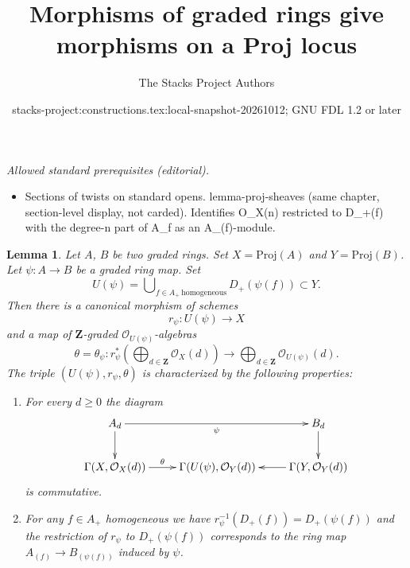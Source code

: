 \documentclass{stacks-project}
\title{Morphisms of graded rings give morphisms on a Proj locus}
\author{The Stacks Project Authors}
\date{stacks-project:constructions.tex:local-snapshot-20261012; GNU FDL 1.2 or later}
\theoremstyle{plain}
\newtheorem{lemma}[subsection]{Lemma}
\theoremstyle{definition}
\theoremstyle{remark}
\numberwithin{equation}{subsection}
\begin{document}
\maketitle
\noindent\textit{Allowed standard prerequisites (editorial).}\begin{itemize}
\item Sections of twists on standard opens. lemma-proj-sheaves (same chapter, section-level display, not carded). Identifies O\_X(n) restricted to D\_+(f) with the degree-n part of A\_f as an A\_(f)-module.
\end{itemize}\medskip
\begin{lemma}
\label{lemma-morphism-proj}
Let $A$, $B$ be two graded rings.
Set $X = \text{Proj}(A)$ and $Y = \text{Proj}(B)$.
Let $\psi : A \to B$ be a graded ring map.
Set
$$
U(\psi)
=
\bigcup\nolimits_{f \in A_{+}\ \text{homogeneous}} D_{+}(\psi(f))
\subset Y.
$$
Then there is a canonical morphism of schemes
$$
r_\psi :
U(\psi)
\longrightarrow
X
$$
and a map of $\mathbf{Z}$-graded $\mathcal{O}_{U(\psi)}$-algebras
$$
\theta = \theta_\psi :
r_\psi^*\left(
\bigoplus\nolimits_{d \in \mathbf{Z}} \mathcal{O}_X(d)
\right)
\longrightarrow
\bigoplus\nolimits_{d \in \mathbf{Z}} \mathcal{O}_{U(\psi)}(d).
$$
The triple $(U(\psi), r_\psi, \theta)$ is
characterized by the following properties:
\begin{enumerate}
\item For every $d \geq 0$ the diagram
$$
\xymatrix{
A_d \ar[d] \ar[rr]_{\psi} & &
B_d \ar[d] \\
\Gamma(X, \mathcal{O}_X(d)) \ar[r]^-\theta &
\Gamma(U(\psi), \mathcal{O}_Y(d)) &
\Gamma(Y, \mathcal{O}_Y(d)) \ar[l]
}
$$
is commutative.
\item For any $f \in A_{+}$ homogeneous
we have $r_\psi^{-1}(D_{+}(f)) = D_{+}(\psi(f))$ and
the restriction of $r_\psi$ to $D_{+}(\psi(f))$
corresponds to the ring map
$A_{(f)} \to B_{(\psi(f))}$ induced by $\psi$.
\end{enumerate}
\end{lemma}
\end{document}
